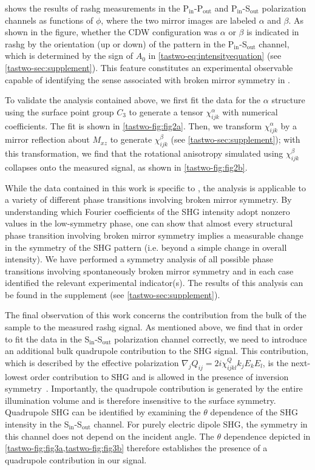  shows the results of \gls{rashg} measurements in the P$_\mathrm{in}$-P$_\mathrm{out}$ and P$_\mathrm{in}$-S$_\mathrm{out}$ polarization channels as functions of $\phi$, where the two mirror images are labeled $\alpha$ and $\beta$.
As shown in the figure, whether the CDW configuration was $\alpha$ or $\beta$ is indicated in \gls{rashg} by the orientation (up or down) of the pattern in the P$_\mathrm{in}$-S$_\mathrm{out}$ channel, which is determined by the sign of $A_0$ in \cref{tastwo-eq:intensityequation} (see \cref{tastwo-sec:supplement}).
This feature constitutes an experimental observable capable of identifying the sense associated with broken mirror symmetry in \tastwo. 

To validate the analysis contained above, we first fit the data for the $\alpha$ structure using the surface point group $C_{3}$ to generate a tensor $\chi^\alpha_{ijk}$ with numerical coefficients.
The fit is shown in \cref{tastwo-fig:fig2a}.
Then, we transform $\chi^\alpha_{ijk}$ by a mirror reflection about $M_{xz}$ to generate $\chi_{ijk}^\beta$ (see \cref{tastwo-sec:supplement}); with this transformation, we find that the rotational anisotropy simulated using $\chi_{ijk}^\beta$ collapses onto the measured signal, as shown in \cref{tastwo-fig:fig2b}.

While the data contained in this work is specific to \tastwo, the analysis is applicable to a variety of different phase transitions involving broken mirror symmetry.
By understanding which Fourier coefficients of the SHG intensity adopt nonzero values in the low-symmetry phase, one can show that almost every structural phase transition involving broken mirror symmetry implies a measurable change in the symmetry of the SHG pattern (i.e. beyond a simple change in overall intensity).
We have performed a symmetry analysis of all possible phase transitions involving spontaneously broken mirror symmetry and in each case identified the relevant experimental indicator(s).
The results of this analysis can be found in the supplement (see \cref{tastwo-sec:supplement}).

The final observation of this work concerns the contribution from the bulk of the sample to the measured \gls{rashg} signal.
As mentioned above, we find that in order to fit the data in the S$_\mathrm{in}$-S$_\mathrm{out}$ polarization channel correctly, we need to introduce an additional bulk quadrupole contribution to the SHG signal.
This contribution, which is described by the effective polarization $\nabla_j Q_{ij} = 2i\chi_{ijkl}^Qk_j E_k E_l$, is the next-lowest order contribution to SHG and is allowed in the presence of inversion symmetry~\citep{kumar_magnetic_2017, shen}.
Importantly, the quadrupole contribution is generated by the entire illumination volume and is therefore insensitive to the surface symmetry.
Quadrupole SHG can be identified by examining the $\theta$ dependence of the SHG intensity in the S$_\mathrm{in}$-S$_\mathrm{out}$ channel.
For purely electric dipole SHG, the symmetry in this channel does not depend on the incident angle.
The $\theta$ dependence depicted in \cref{tastwo-fig:fig3a,tastwo-fig:fig3b} therefore establishes the presence of a quadrupole contribution in our signal.

